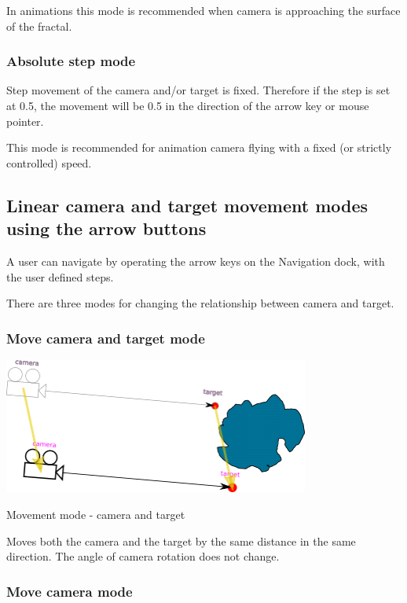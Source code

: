 In animations this mode is recommended when camera is approaching the surface of
the fractal.

\subsubsection{Absolute step mode}\label{absolute-step-mode}

Step movement of the camera and/or target is fixed. Therefore if the step is set
at 0.5, the movement will be 0.5 in the direction of the arrow key or mouse
pointer.

This mode is recommended for animation camera flying with a fixed (or strictly
controlled) speed.

\subsection{Linear camera and target movement modes using the arrow
	buttons}\label{linear-camera-and-target-movement-modes-using-the-arrow-buttons}

A user can navigate by operating the arrow keys on the Navigation dock, with the
user defined steps.

There are three modes for changing the relationship between camera and target.

\subsubsection{Move camera and target mode}\label{move-camera-and-target-mode}

\includegraphics[width=3.95347in,height=1.75556in]{img/manual/media/image11.png}

Movement mode - camera and target

Moves both the camera and the target by the same distance in the same direction.
The angle of camera rotation does not change.

\subsubsection{Move camera mode}\label{move-camera-mode}

